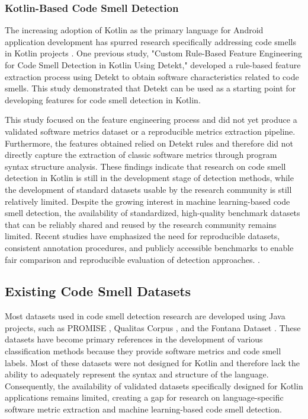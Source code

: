 \documentclass[]{einformatica}
\begin{document}
\subsubsection{Kotlin-Based Code Smell Detection}
The increasing adoption of Kotlin as the primary language for Android application development has spurred research specifically addressing code smells in Kotlin projects \cite{Dewangan2023}\cite{ugli2025codesmells}. One previous study, "Custom Rule-Based Feature Engineering for Code Smell Detection in Kotlin Using Detekt," \cite{WibowoICITDA2025} developed a rule-based feature extraction process using Detekt to obtain software characteristics related to code smells. This study demonstrated that Detekt can be used as a starting point for developing features for code smell detection in Kotlin.

This study focused on the feature engineering process and did not yet produce a validated software metrics dataset or a reproducible metrics extraction pipeline. Furthermore, the features obtained relied on Detekt rules and therefore did not directly capture the extraction of classic software metrics through program syntax structure analysis. These findings indicate that research on code smell detection in Kotlin is still in the development stage of detection methods, while the development of standard datasets usable by the research community is still relatively limited. Despite the growing interest in machine learning-based code smell detection, the availability of standardized, high-quality benchmark datasets that can be reliably shared and reused by the research community remains limited. Recent studies have emphasized the need for reproducible datasets, consistent annotation procedures, and publicly accessible benchmarks to enable fair comparison and reproducible evaluation of detection approaches. \cite{PROKIC2024103168}\cite{SLIVKA2023102999}\cite{zhang2026sacscodesmelldataset}\cite{Alomari2025}.

\subsection{Existing Code Smell Datasets}
Most datasets used in code smell detection research are developed using Java projects, such as PROMISE \cite{Gupta2025}, Qualitas Corpus \cite{Tempero2010}\cite{Terra2013}, and the Fontana Dataset \cite{Fontana2017}. These datasets have become primary references in the development of various classification methods because they provide software metrics and code smell labels. Most of these datasets were not designed for Kotlin and therefore lack the ability to adequately represent the syntax and structure of the language. Consequently, the availability of validated datasets specifically designed for Kotlin applications remains limited, creating a gap for research on language-specific software metric extraction and machine learning-based code smell detection.
\end{document}

